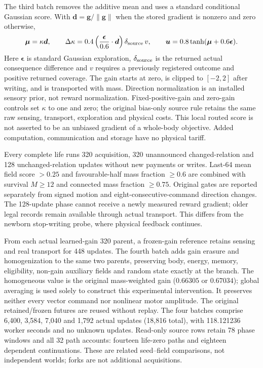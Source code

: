 The third batch removes the additive mean and uses a standard conditional Gaussian score\cite{williams}. With $\boldsymbol d=\boldsymbol g/\|\boldsymbol g\|$ when the stored gradient is nonzero and zero otherwise,
\begin{equation}
\boldsymbol\mu=\kappa\boldsymbol d,\qquad
\Delta\kappa=0.4\left(\frac{\boldsymbol\epsilon}{0.6}\cdot\boldsymbol d\right)\delta_{\rm source}\,v,\qquad
\boldsymbol u=0.8\tanh(\boldsymbol\mu+0.6\boldsymbol\epsilon).
\end{equation}
Here $\boldsymbol\epsilon$ is standard Gaussian exploration, $\delta_{\rm source}$ is the returned actual consequence difference and $v$ requires a previously registered outcome and positive returned coverage. The gain starts at zero, is clipped to $[-2,2]$ after writing, and is transported with mass. Direction normalization is an installed sensory prior, not reward normalization. Fixed-positive-gain and zero-gain controls set $\kappa$ to one and zero; the original bias-only source rule retains the same raw sensing, transport, exploration and physical costs. This local routed score is not asserted to be an unbiased gradient of a whole-body objective. Added computation, communication and storage have no physical tariff.

Every complete life runs 320 acquisition, 320 unannounced changed-relation and 128 unchanged-relation updates without new payments or writes. Last-64 mean field score $>0.25$ and favourable-half mass fraction $\geq0.6$ are combined with survival $M\geq12$ and connected mass fraction $\geq0.75$. Original gates are reported separately from signed motion and eight-consecutive-command direction changes. The 128-update phase cannot receive a newly measured reward gradient; older legal records remain available through actual transport. This differs from the newborn stop-writing probe, where physical feedback continues.

From each actual learned-gain 320 parent, a frozen-gain reference retains sensing and real transport for 448 updates. The fourth batch adds gain erasure and homogenization to the same two parents, preserving body, energy, memory, eligibility, non-gain auxiliary fields and random state exactly at the branch. The homogeneous value is the original mass-weighted gain ($0.66305$ or $0.67034$); global averaging is used solely to construct this experimental intervention. It preserves neither every vector command nor nonlinear motor amplitude. The original retained/frozen futures are reused without replay. The four batches comprise 6,400, 3,584, 7,040 and 1,792 actual updates (18,816 total), with 118.121236 worker seconds and no unknown updates. Read-only source rows retain 78 phase windows and all 32 path accounts: fourteen life-zero paths and eighteen dependent continuations. These are related seed--field comparisons, not independent worlds; forks are not additional acquisitions.

